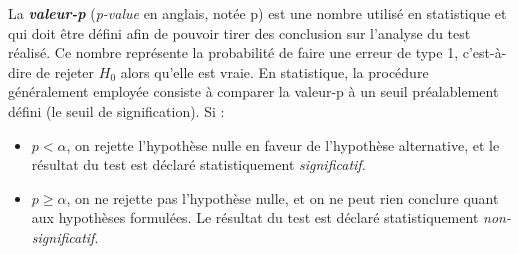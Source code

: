 \documentclass[10pt, oneside, a4paper]{article}
\begin{document}
La \textbf{\textit{valeur-p}} (\textit{p-value} en anglais, notée p) est une nombre utilisé en statistique et qui doit être défini afin de pouvoir tirer des conclusion sur l'analyse du test réalisé. Ce nombre représente la probabilité de faire une erreur de type 1, c'est-à-dire de rejeter $H_{0}$ alors qu'elle est vraie. En statistique, la procédure généralement employée consiste à comparer la valeur-p à un seuil préalablement défini (le seuil de signification). Si :
\begin{itemize}
\item $p < {\alpha}$, on rejette l'hypothèse nulle en faveur de l’hypothèse alternative, et le résultat du test est déclaré statistiquement \textit{significatif}.
\item $p \geq {\alpha}$, on ne rejette pas l’hypothèse nulle, et on ne peut rien conclure quant aux hypothèses formulées. Le résultat du test est déclaré statistiquement \textit{non-significatif}.\\
\end{itemize}
\end{document}

